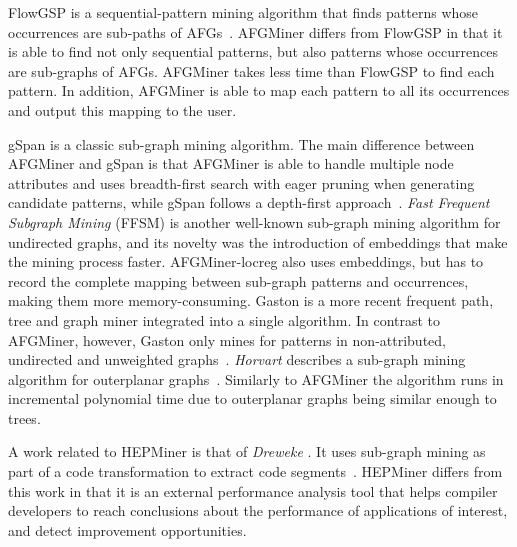 FlowGSP is a sequential-pattern mining algorithm that finds patterns whose occurrences are sub-paths of AFGs~\cite{JockschCC10, FlowGSP}. AFGMiner differs from FlowGSP in that it is able to find not only sequential patterns, but also patterns whose occurrences are sub-graphs of AFGs. AFGMiner takes less time than FlowGSP to find each pattern. In addition, AFGMiner is able to map each pattern to all its occurrences and output this mapping to the user.

gSpan is a classic sub-graph mining algorithm. The main difference between AFGMiner and gSpan is that AFGMiner is able to handle multiple node attributes and uses breadth-first search with eager pruning when generating candidate patterns, while gSpan follows a depth-first approach~\cite{gSpan}. \emph{Fast Frequent Subgraph Mining} (FFSM) is another well-known sub-graph mining algorithm for undirected graphs, and its novelty was the introduction of embeddings that make the mining process faster. AFGMiner-locreg also uses embeddings, but has to record the complete mapping between sub-graph patterns and occurrences, making them more memory-consuming. Gaston is a more recent frequent path, tree and graph miner integrated into a single algorithm. In contrast to AFGMiner, however, Gaston only mines for patterns in non-attributed, undirected and unweighted graphs~\cite{Gaston}. \emph{Horvart \etal} describes a sub-graph mining algorithm for outerplanar graphs~\cite{HorvathKDD06}. Similarly to AFGMiner the algorithm runs in incremental polynomial time due to outerplanar graphs being similar enough to trees.

A work related to HEPMiner is that of \emph{Dreweke \etal}. It uses sub-graph mining as part of a code transformation to extract code segments~\cite{DrewekeCGO07}. HEPMiner differs from this work in that it is an external performance analysis tool that helps compiler developers to reach conclusions about the performance of applications of interest, and detect improvement opportunities. 
